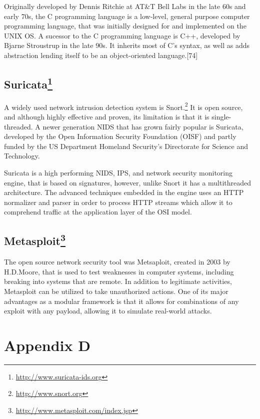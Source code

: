 \documentclass[11pt,]{article}
\let\rmarkdownfootnote\footnote%
\def\footnote{\protect\rmarkdownfootnote}
\begin{document}
Originally developed by Dennis Ritchie at AT\&T Bell Labs in the late
60s and early 70s, the C programming language is a low-level, general
purpose computer programming language, that was initially designed for
and implemented on the UNIX OS. A sucessor to the C programming language
is C++, developed by Bjarne Stroustrup in the late 90s. It inherits most
of C's syntax, as well as adds abstraction lending itself to be an
object-oriented language.{[}74{]}

\subsection[Suricata]{Suricata\footnote{\url{http://www.suricata-ids.org}}}\label{suricata9}

A widely used network intrusion detection system is Snort.\footnote{\url{http://www.snort.org}}
It is open source, and although highly effective and proven, its
limitation is that it is single-threaded. A newer generation NIDS that
has grown fairly popular is Suricata, developed by the Open Information
Security Foundation (OISF) and partly funded by the US Department
Homeland Security's Directorate for Science and Technology.

Suricata is a high performing NIDS, IPS, and network security monitoring
engine, that is based on signatures, however, unlike Snort it has a
multithreaded architecture. The advanced techniques embedded in the
engine uses an HTTP normalizer and parser in order to process HTTP
streams which allow it to comprehend traffic at the application layer of
the OSI model.

\subsection[Metasploit]{Metasploit\footnote{\url{http://www.metasploit.com/index.jsp}}}\label{metasploit11}

The open source network security tool was Metsaploit, created in 2003 by
H.D.Moore, that is used to test weaknesses in computer systems,
including breaking into systems that are remote. In addition to
legitimate activities, Metasploit can be utilized to take unauthorized
actions. One of its major advantages as a modular framework is that it
allows for combinations of any exploit with any payload, allowing it to
simulate real-world attacks.

\newpage

\section*{Appendix D}\label{appendix-d}
\end{document}
